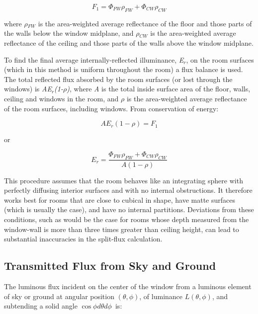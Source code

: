 \begin{equation}
{F_1} = {\Phi_{FW}}{\rho_{FW}} + {\Phi_{CW}}{\rho_{CW}}
\end{equation}

where \emph{$\rho$\(_{FW}\)} is the area-weighted average reflectance of the floor and those parts of the walls below the window midplane, and \emph{$\rho$\(_{CW}\)} is the area-weighted average reflectance of the ceiling and those parts of the walls above the window midplane.

To find the final average internally-reflected illuminance, \emph{E\(_{r}\)}, on the room surfaces (which in this method is uniform throughout the room) a flux balance is used. The total reflected flux absorbed by the room surfaces (or lost through the windows) is \emph{AE\(_{r}\)(1-$\rho$)}, where \emph{A} is the total inside surface area of the floor, walls, ceiling and windows in the room, and \emph{$\rho$} is the area-weighted average reflectance of the room surfaces, including windows. From conservation of energy:

\begin{equation}
A{E_r}(1 - \rho ) = {F_1}
\end{equation}

or

\begin{equation}
{E_r} = \frac{{{\Phi_{FW}}{\rho_{FW}} + {\Phi_{CW}}{\rho_{CW}}}}{{A(1 - \rho )}}
\end{equation}

This procedure assumes that the room behaves like an integrating sphere with perfectly diffusing interior surfaces and with no internal obstructions. It therefore works best for rooms that are close to cubical in shape, have matte surfaces (which is usually the case), and have no internal partitions. Deviations from these conditions, such as would be the case for rooms whose depth measured from the window-wall is more than three times greater than ceiling height, can lead to substantial inaccuracies in the split-flux calculation.

\subsection{Transmitted Flux from Sky and Ground}\label{transmitted-flux-from-sky-and-ground}

The luminous flux incident on the center of the window from a luminous element of sky or ground at angular position \((\theta ,\phi )\), of luminance \(L(\theta ,\phi )\), and subtending a solid angle \(\cos \phi d\theta d\phi\)~is:

